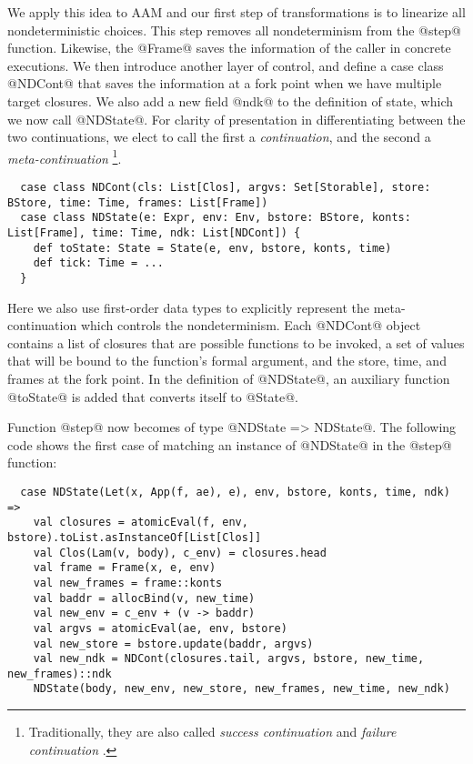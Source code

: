 \documentclass[acmsmall, review]{acmart}\settopmatter{}
\begin{document}
We apply this idea to AAM and our first step of transformations is to linearize all
nondeterministic choices. This step removes all nondeterminism from the @step@ function.
Likewise, the @Frame@ saves the information of the caller in concrete executions.
We then introduce another layer of control, and define a case class @NDCont@
that saves the information at a fork point when we have multiple target closures.
We also add a new field @ndk@ to the definition of state, which we now call @NDState@.
For clarity of presentation in differentiating between the two continuations, we elect to call
the first a \emph{continuation}, and the second a \emph{meta-continuation}
\footnote{Traditionally, they are also called \emph{success continuation} and \emph{failure
continuation} \cite{Danvy:1990:AC:91556.91622}.}.

\begin{lstlisting}
  case class NDCont(cls: List[Clos], argvs: Set[Storable], store: BStore, time: Time, frames: List[Frame])
  case class NDState(e: Expr, env: Env, bstore: BStore, konts: List[Frame], time: Time, ndk: List[NDCont]) {
    def toState: State = State(e, env, bstore, konts, time)
    def tick: Time = ...
  }
\end{lstlisting}

Here we also use first-order data types to explicitly represent the meta-continuation which
controls the nondeterminism.
Each @NDCont@ object contains a list of closures that are possible functions to be invoked,
a set of values that will be bound to the function's formal argument, and the store, time,
and frames at the fork point. In the definition of @NDState@, an auxiliary function @toState@
is added that converts itself to @State@.

Function @step@ now becomes of type @NDState => NDState@.
The following code shows the first case of matching an instance of @NDState@ in
the @step@ function:

\begin{lstlisting}
  case NDState(Let(x, App(f, ae), e), env, bstore, konts, time, ndk) =>
    val closures = atomicEval(f, env, bstore).toList.asInstanceOf[List[Clos]]
    val Clos(Lam(v, body), c_env) = closures.head
    val frame = Frame(x, e, env)
    val new_frames = frame::konts
    val baddr = allocBind(v, new_time)
    val new_env = c_env + (v -> baddr)
    val argvs = atomicEval(ae, env, bstore)
    val new_store = bstore.update(baddr, argvs)
    val new_ndk = NDCont(closures.tail, argvs, bstore, new_time, new_frames)::ndk
    NDState(body, new_env, new_store, new_frames, new_time, new_ndk)
\end{lstlisting}
\end{document}
